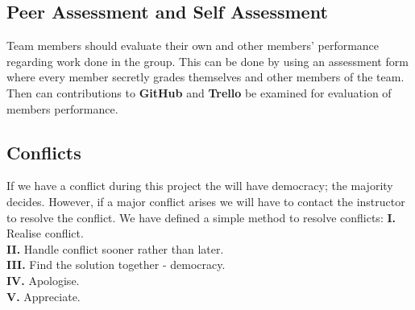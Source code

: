 \documentclass[11pt]{article}
\begin{document}
\subsection{Peer Assessment and Self Assessment}
Team members should evaluate their own and other members' performance regarding work done in the group. This can be
done by using an assessment form where every member secretly grades themselves and other members of the team. Then can contributions to
\textbf{GitHub} and \textbf{Trello} be examined for evaluation of members performance.

\subsection{Conflicts}
If we have a conflict during this project the will have democracy; the majority decides. However, if a major conflict arises we will have to contact the instructor to resolve the conflict. We have defined a simple method to resolve conflicts: 
\newline
\textbf{I.} Realise conflict. \\
\textbf{II.} Handle conflict sooner rather than later. \\
\textbf{III.} Find the solution together - democracy. \\
\textbf{IV.} Apologise. \\
\textbf{V.} Appreciate. \\
\end{document}
